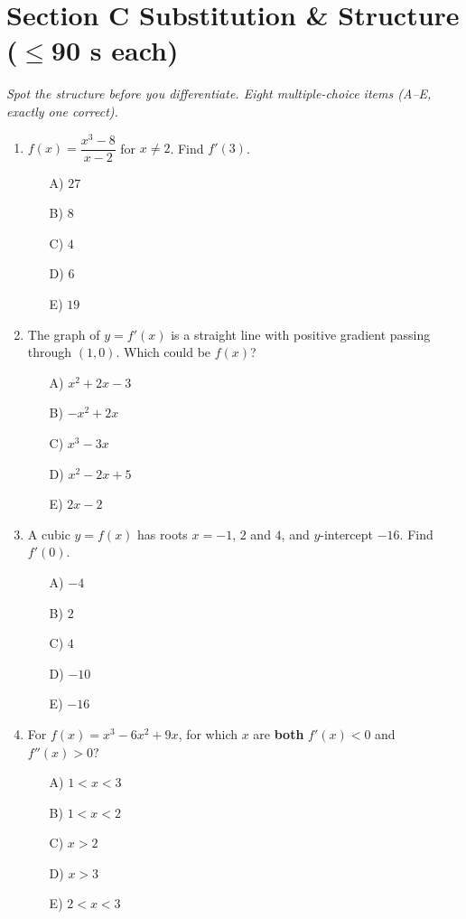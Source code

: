 \documentclass[11pt,a4paper]{article}
\begin{document}
\section*{Section C \quad Substitution \& Structure \hfill{\normalfont\small($\leq$90 s each)}}

\noindent\textit{Spot the structure before you differentiate. Eight multiple-choice items (A--E, exactly one correct).}

\begin{enumerate}

\item $f(x)=\dfrac{x^3-8}{x-2}$ for $x\neq 2$. Find $f'(3)$.
\begin{itemize}
\item[A)] $27$
\item[B)] $8$
\item[C)] $4$
\item[D)] $6$
\item[E)] $19$
\end{itemize}

\item The graph of $y=f'(x)$ is a straight line with positive gradient passing through $(1,0)$. Which could be $f(x)$?
\begin{itemize}
\item[A)] $x^2+2x-3$
\item[B)] $-x^2+2x$
\item[C)] $x^3-3x$
\item[D)] $x^2-2x+5$
\item[E)] $2x-2$
\end{itemize}

\item A cubic $y=f(x)$ has roots $x=-1$, $2$ and $4$, and $y$-intercept $-16$. Find $f'(0)$.
\begin{itemize}
\item[A)] $-4$
\item[B)] $2$
\item[C)] $4$
\item[D)] $-10$
\item[E)] $-16$
\end{itemize}

\item For $f(x)=x^3-6x^2+9x$, for which $x$ are \textbf{both} $f'(x)<0$ and $f''(x)>0$?
\begin{itemize}
\item[A)] $1<x<3$
\item[B)] $1<x<2$
\item[C)] $x>2$
\item[D)] $x>3$
\item[E)] $2<x<3$
\end{itemize}


\end{enumerate}
\end{document}
